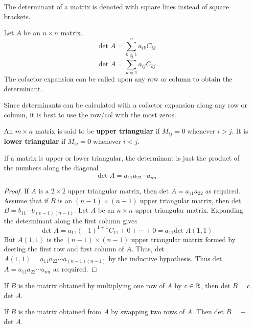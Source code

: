 \documentclass[english, 12pt]{article}
\begin{document}
\begin{note}
The determinant of a matrix is denoted with square lines instead of square brackets.
\end{note}

\begin{thrm}
Let $A$ be an $n \times n$ matrix.
\[\text{det }A = \sum_{k=1}^n a_{ik}C_{ik}\]
\[\text{det }A = \sum_{k=1}^n a_{ij}C_{kj}\]
The cofactor expansion can be called upon any row or column to obtain the determinant.
\end{thrm}

\begin{note}
Since determinants can be calculated with a cofactor expansion along any row or column, it is best to use the row/col with the most zeros.
\end{note}

\begin{defn}
An $m \times n$ matrix is said to be \textbf{upper triangular} if  $M_{ij} = 0$ whenever $i > j$. It is \textbf{lower triangular} if $M_{ij} = 0$ whenever $ i < j$.
\end{defn}

\begin{thrm}
If a matrix is upper or lower triangular, the determinant is just the product of the numbers along the diagonal
\[\text{det }A = a_{11}a_{22}\cdots a_{nn}\]
\begin{proof}
If $A$ is a $2 \times 2$ upper triangular matrix, then det $A=a_{11}a_{22}$ as required. Assume that if $B$ is an $(n-1) \times (n-1)$ upper triangular matrix, then det $B = b_{11}\cdots b_{(n-1)(n-1)}$. Let $A$ be an $n \times n$ upper triangular matrix. Expanding the determinant along the first column gives
\[\text{det }A = a_{11}(-1)^{1+1}C_{11} + 0 + \cdots + 0 = a_{11} \text{det }A(1,1)\]
But $A(1,1)$ is the $(n-1) \times (n-1)$ upper triangular matrix formed by deeting the first row and first column of $A$. Thus, det $A(1,1) = a_{11}a_{22}\cdots a_{(n-1)(n-1)}$ by the inductive hypothesis. Thus det $A = a_{11}a_{22}\cdots a_{nn}$ as required.
\end{proof}
\end{thrm}

\begin{thrm}
If $B$ is the matrix obtained by multiplying one row of $A$ by $c \in {\mathbb{R}}$, then det $B = c$ det $A$.
\end{thrm}

\begin{thrm}
If $B$ is the matrix obtained from $A$ by swapping two rows of $A$. Then det $B = -$det $A$.
\end{thrm}
\end{document}
